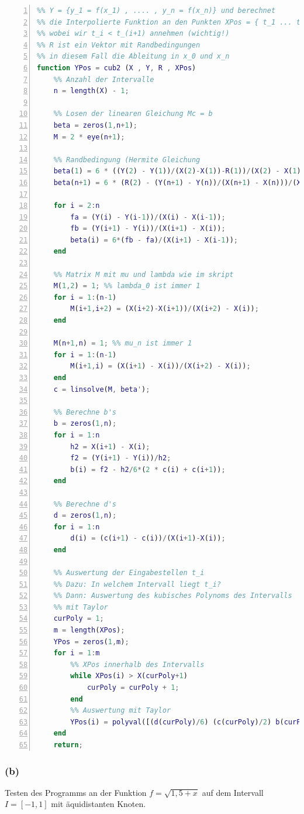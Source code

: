 \documentclass[11pt,a4paper,ngerman]{article}
\begin{document}
\begin{lstlisting}[basicstyle=\ttfamily\scriptsize\selectfont\upshape,language=matlab,numbers=left,]
%% Gibt ein Gitter X = {x_1, ..., x_n} vor mit Werten
%% Y = {y_1 = f(x_1) , .... , y_n = f(x_n)} und berechnet
%% die Interpolierte Funktion an den Punkten XPos = { t_1 ... t_m }
%% wobei wir t_i < t_(i+1) annehmen (wichtig!)
%% R ist ein Vektor mit Randbedingungen
%% in diesem Fall die Ableitung in x_0 und x_n
function YPos = cub2 (X , Y, R , XPos)
    %% Anzahl der Intervalle
    n = length(X) - 1;

    %% Losen der linearen Gleichung Mc = b
    beta = zeros(1,n+1);
    M = 2 * eye(n+1);
    
    %% Randbedingung (Hermite Gleichung
    beta(1) = 6 * ((Y(2) - Y(1))/(X(2)-X(1))-R(1))/(X(2) - X(1));
    beta(n+1) = 6 * (R(2) - (Y(n+1) - Y(n))/(X(n+1) - X(n)))/(X(n+1)-X(n));

    for i = 2:n
        fa = (Y(i) - Y(i-1))/(X(i) - X(i-1));
        fb = (Y(i+1) - Y(i))/(X(i+1) - X(i));
        beta(i) = 6*(fb - fa)/(X(i+1) - X(i-1));
    end

    %% Matrix M mit mu und lambda wie im skript
    M(1,2) = 1; %% lambda_0 ist immer 1
    for i = 1:(n-1)
        M(i+1,i+2) = (X(i+2)-X(i+1))/(X(i+2) - X(i));
    end

    M(n+1,n) = 1; %% mu_n ist immer 1
    for i = 1:(n-1)
        M(i+1,i) = (X(i+1) - X(i))/(X(i+2) - X(i));
    end
    c = linsolve(M, beta');
    
    %% Berechne b's
    b = zeros(1,n);
    for i = 1:n
        h2 = X(i+1) - X(i);
        f2 = (Y(i+1) - Y(i))/h2;
        b(i) = f2 - h2/6*(2 * c(i) + c(i+1));
    end

    %% Berechne d's
    d = zeros(1,n);
    for i = 1:n
        d(i) = (c(i+1) - c(i))/(X(i+1)-X(i));
    end
   
    %% Auswertung der Eingabestellen t_i
    %% Dazu: In welchem Intervall liegt t_i?
    %% Dann: Auswertung des kubisches Polynoms des Intervalls
    %% mit Taylor
    curPoly = 1;
    m = length(XPos);
    YPos = zeros(1,m);
    for i = 1:m
        %% XPos innerhalb des Intervalls
        while XPos(i) > X(curPoly+1)
            curPoly = curPoly + 1;
        end
        %% Auswertung mit Taylor
        YPos(i) = polyval([(d(curPoly)/6) (c(curPoly)/2) b(curPoly) Y(curPoly)], (XPos(i) - X(curPoly)));
    end
    return;
\end{lstlisting}

\subsubsection*{(b)}
Testen des Programms an der Funktion $f = \sqrt{1,5 + x}$ auf dem Intervall $I = [-1,1]$
mit äquidistanten Knoten.\\
\end{document}

